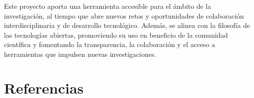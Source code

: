 \documentclass[
  12pt,
  letterpaper,
  DIV=11,
  numbers=noendperiod]{scrreport}
\begin{document}
Este proyecto aporta una herramienta accesible para el ámbito de la
investigación, al tiempo que abre nuevos retos y oportunidades de
colaboración interdisciplinaria y de desarrollo tecnológico. Además, se
alinea con la filosofía de las tecnologías abiertas, promoviendo su uso
en beneficio de la comunidad científica y fomentando la transparencia,
la colaboración y el acceso a herramientas que impulsen nuevas
investigaciones.


\hypertarget{referencias}{%
\chapter*{Referencias}\label{referencias}}

\end{document}
